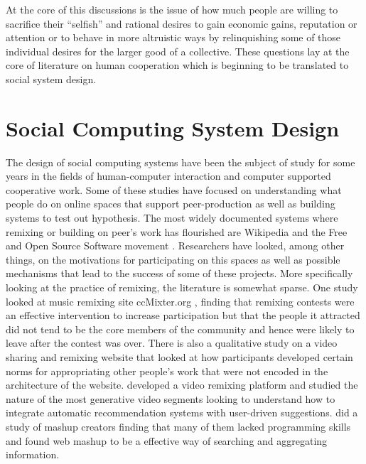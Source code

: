 At the core of this discussions is the issue of how much people are willing to sacrifice their ``selfish'' and rational desires to gain economic gains, reputation or attention or to behave in more altruistic ways by relinquishing some of those individual desires for the larger good of a collective. 
These questions lay at the core of literature on human cooperation which is beginning to be translated to social system design.

\section{Social Computing System Design}
The design of social computing systems have been the subject of study for some years in the fields of human-computer interaction and computer supported cooperative work. Some of these studies have focused on understanding what people do on online spaces that support peer-production as well as building systems to test out hypothesis. 
The most widely documented systems where remixing or building on peer's work has flourished are Wikipedia and the Free and Open Source Software movement \citep{raymond, benkler, viegas, newbook, kittur}. 
Researchers have looked, among other things, on the motivations for participating on this spaces as well as possible mechanisms that lead to the success of some of these projects.
More specifically looking at the practice of remixing, the literature is somewhat sparse. 
One study looked at music remixing site ccMixter.org \citep{cheliotis_analysis_2009}, finding that remixing contests were an effective intervention to increase participation but that the people it attracted did not tend to be the core members of the community and hence were likely to leave after the contest was over.
There is also a qualitative study on a video sharing and remixing website \citet{diakopoulos_evolution_2007} that looked at how participants developed certain norms for appropriating other people's work that were not encoded in the architecture of the website.
\citet{shaw_community_2006} developed a video remixing platform and studied the nature of the most generative video segments looking to understand how to integrate automatic recommendation systems with user-driven suggestions.
\citet{zang_mashup} did a study of mashup creators finding that many of them lacked programming skills and found web mashup to be a effective way of searching and aggregating information. 
